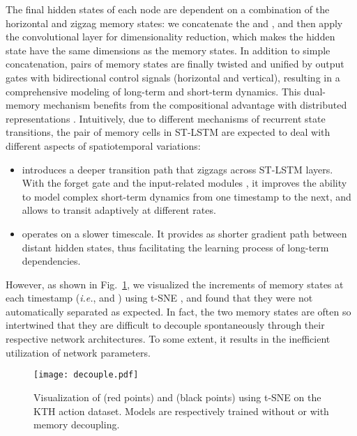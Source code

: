 \documentclass[10pt,journal,compsoc]{IEEEtran}
\let\MYoriglatexcaption\caption
\renewcommand{\caption}[2][\relax]{\MYoriglatexcaption[#2]{#2}}
\newcommand{\fig}[1]{Fig.~\ref{#1}}
\begin{document}
The final hidden states  of each node are dependent on a combination of the horizontal and zigzag memory states: we concatenate the  and , and then apply the  convolutional layer for dimensionality reduction, which makes the hidden state  have the same dimensions as the memory states. 
In addition to simple concatenation, pairs of memory states are finally twisted and unified by output gates with bidirectional control signals (horizontal and vertical), resulting in a comprehensive modeling of long-term and short-term dynamics.
This dual-memory mechanism benefits from the compositional advantage with distributed representations \cite{hinton1984distributed,bengio2000taking}.  
Intuitively, due to different mechanisms of recurrent state transitions, the pair of memory cells in ST-LSTM are expected to deal with different aspects of spatiotemporal variations:
\begin{itemize}
    \item  introduces a deeper transition path that zigzags across ST-LSTM layers. With the forget gate  and the input-related modules , it improves the ability to model complex short-term dynamics from one timestamp to the next, and allows  to transit adaptively at different rates.
    \item  operates on a slower timescale. It provides as shorter gradient path between distant hidden states, thus facilitating the learning process of long-term dependencies.
\end{itemize}


However, as shown in \fig{fig:decouple}, we visualized the increments of memory states at each timestamp (\textit{i.e.},  and ) using t-SNE \cite{maaten2008visualizing}, and found that they were not automatically separated as expected.
In fact, the two memory states are often so intertwined that they are difficult to decouple spontaneously through their respective network architectures.
To some extent, it results in the inefficient utilization of network parameters.


\begin{figure}[t]
  \centering
  \texttt{[image: decouple.pdf]}
  \vskip -0.1in
  \caption{Visualization of  (red points) and  (black points) using t-SNE \cite{maaten2008visualizing} on the KTH action dataset. Models are respectively trained without or with memory decoupling.}
  \label{fig:decouple}
  \vspace{-5pt}
\end{figure}
\end{document}
